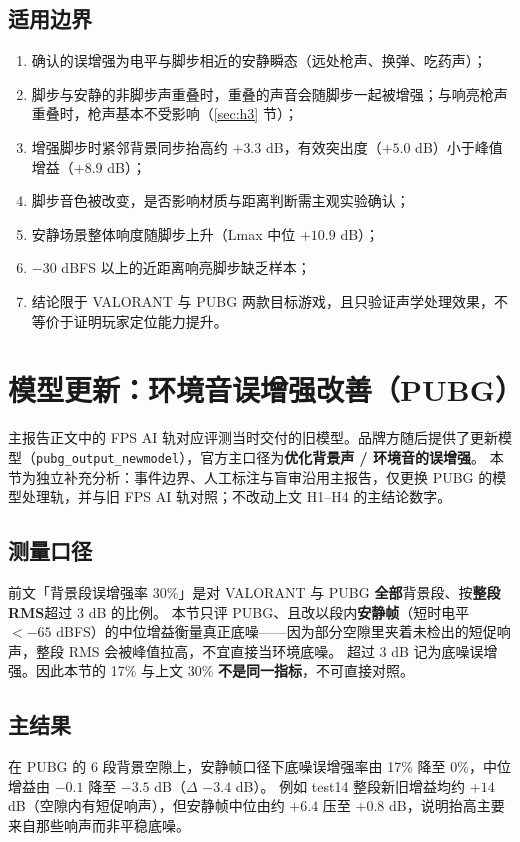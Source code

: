\documentclass[11pt,a4paper]{ctexart}
\begin{document}
\subsection{适用边界}\label{sec:bound}
\begin{enumerate}
\item 确认的误增强为电平与脚步相近的安静瞬态（远处枪声、换弹、吃药声）；
\item 脚步与安静的非脚步声重叠时，重叠的声音会随脚步一起被增强；与响亮枪声重叠时，枪声基本不受影响（\ref{sec:h3} 节）；
\item 增强脚步时紧邻背景同步抬高约 $+3.3$ dB，有效突出度（$+5.0$ dB）小于峰值增益（$+8.9$ dB）；
\item 脚步音色被改变，是否影响材质与距离判断需主观实验确认；
\item 安静场景整体响度随脚步上升（Lmax 中位 $+10.9$ dB）；
\item $-30$ dBFS 以上的近距离响亮脚步缺乏样本；
\item 结论限于 VALORANT 与 PUBG 两款目标游戏，且只验证声学处理效果，不等价于证明玩家定位能力提升。
\end{enumerate}

\section{模型更新：环境音误增强改善（PUBG）}\label{sec:nm_bg}
主报告正文中的 FPS AI 轨对应评测当时交付的旧模型。品牌方随后提供了更新模型（\texttt{pubg\_output\_newmodel}），官方主口径为\textbf{优化背景声 / 环境音的误增强}。
本节为独立补充分析：事件边界、人工标注与盲审沿用主报告，仅更换 PUBG 的模型处理轨，并与旧 FPS AI 轨对照；不改动上文 H1--H4 的主结论数字。

\subsection{测量口径}
前文「背景段误增强率 30\%」是对 VALORANT 与 PUBG \textbf{全部}背景段、按\textbf{整段 RMS}超过 3 dB 的比例。
本节只评 PUBG、且改以段内\textbf{安静帧}（短时电平 $<-65$ dBFS）的中位增益衡量真正底噪——因为部分空隙里夹着未检出的短促响声，整段 RMS 会被峰值拉高，不宜直接当环境底噪。
超过 3 dB 记为底噪误增强。因此本节的 17\% 与上文 30\% \textbf{不是同一指标}，不可直接对照。

\subsection{主结果}

在 PUBG 的 6 段背景空隙上，安静帧口径下底噪误增强率由 17\% 降至 0\%，中位增益由 $-0.1$ 降至 $-3.5$ dB（$\Delta$ $-3.4$ dB）。
例如 test14 整段新旧增益均约 $+14$ dB（空隙内有短促响声），但安静帧中位由约 $+6.4$ 压至 $+0.8$ dB，说明抬高主要来自那些响声而非平稳底噪。
\end{document}
